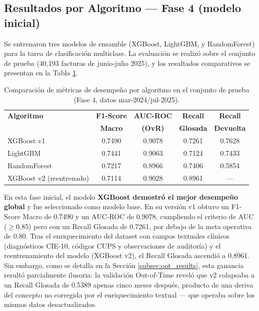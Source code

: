 \documentclass[12pt,letterpaper]{report}
\begin{document}
\subsection{Resultados por Algoritmo — Fase 4 (modelo inicial)}
Se entrenaron tres modelos de ensamble (XGBoost, LightGBM, y RandomForest) para la tarea de clasificación multiclase. La evaluación se realizó sobre el conjunto de prueba (40,193 facturas de junio-julio 2025), y los resultados comparativos se presentan en la Tabla \ref{tab:resultados_modelos}.

\begin{table}[H]
\centering
\caption{Comparación de métricas de desempeño por algoritmo en el conjunto de prueba (Fase 4, datos mar-2024/jul-2025).}
\label{tab:resultados_modelos}
\small
\begin{tabular}{@{}lcccc@{}}
\toprule
\textbf{Algoritmo} & \textbf{F1-Score} & \textbf{AUC-ROC} & \textbf{Recall} & \textbf{Recall} \\
                   & \textbf{Macro}    & \textbf{(OvR)}   & \textbf{Glosada} & \textbf{Devuelta} \\
\midrule
XGBoost v1 & 0.7490 & 0.9078 & 0.7261 & 0.7628 \\
LightGBM & 0.7441 & 0.9063 & 0.7124 & 0.7433 \\
RandomForest & 0.7217 & 0.8966 & 0.7406 & 0.5854 \\
\midrule
XGBoost v2 (reentrenado) & 0.7114 & 0.9028 & 0.8961 & --- \\
\bottomrule
\end{tabular}
\end{table}

En esta fase inicial, el modelo \textbf{XGBoost demostró el mejor desempeño global} y fue seleccionado como modelo base. En su versión v1 obtuvo un F1-Score Macro de 0.7490 y un AUC-ROC de 0.9078, cumpliendo el criterio de AUC ($\geq 0.85$) pero con un Recall Glosada de 0.7261, por debajo de la meta operativa de 0.80. Tras el enriquecimiento del dataset con campos textuales clínicos (diagnósticos CIE-10, códigos CUPS y observaciones de auditoría) y el reentrenamiento del modelo (XGBoost v2), el Recall Glosada ascendió a 0.8961. Sin embargo, como se detalla en la Sección \ref{subsec:oot_results}, esta ganancia resultó parcialmente ilusoria: la validación Out-of-Time reveló que v2 colapsaba a un Recall Glosada de 0.5389 apenas cinco meses después, producto de una deriva del concepto no corregida por el enriquecimiento textual — que operaba sobre los mismos datos desactualizados.
\end{document}
